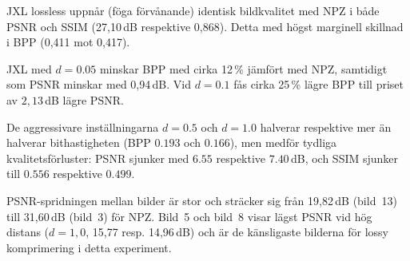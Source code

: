 JXL lossless uppnår (föga förvånande) identisk bildkvalitet med NPZ i både PSNR och SSIM
(27{,}10\,dB respektive 0{,}868). Detta med högst marginell skillnad i BPP (0{,}411 mot 0{,}417).

JXL med $d=0{.}05$ minskar BPP med cirka 12\,\% jämfört med NPZ,
samtidigt som PSNR minskar med 0{,}94\,dB. Vid $d=0{.}1$ fås cirka
25\,\% lägre BPP till priset av $2{,}13$\,dB lägre PSNR.

De aggressivare inställningarna $d=0{.}5$ och $d=1{.}0$ halverar respektive
mer än halverar bithastigheten (BPP $0{.}193$ och $0{.}166$), men medför
tydliga kvalitetsförluster: PSNR sjunker med $6{.}55$ respektive $7{.}40$\,dB,
och SSIM sjunker till $0{.}556$ respektive $0{.}499$.



PSNR-spridningen mellan bilder är stor och sträcker sig från 19{,}82\,dB (bild~13) till
31{,}60\,dB (bild~3) för NPZ.  Bild~5 och bild~8 visar
lägst PSNR vid hög distans ($d=1{,}0$, 15{,}77 resp. 14{,}96\,dB) och
är de känsligaste bilderna för lossy komprimering i detta experiment.
